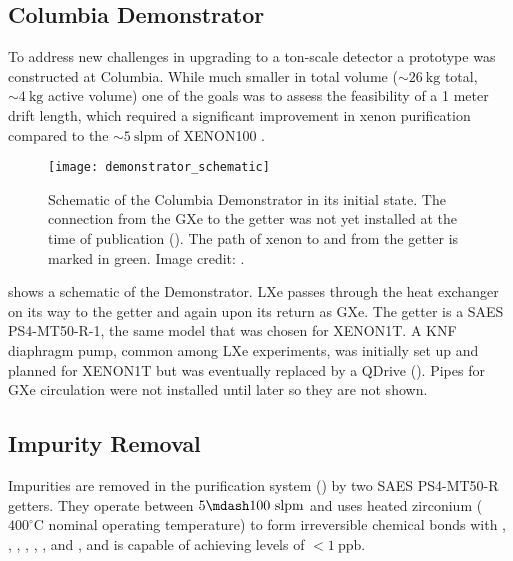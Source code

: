 \subsection{Columbia Demonstrator}
\label{subsec:electron_lifetime_model_demonstrator}
To address new challenges in upgrading to a ton-scale detector a prototype was constructed at Columbia.  While much smaller in total
volume (${\sim}26\ \mathrm{kg}$ total, ${\sim}4\ \mathrm{kg}$ active volume) one of the goals was to assess the feasibility of a 1 meter
drift length, which required a significant improvement in xenon purification compared to the ${\sim}5\ \mathrm{slpm}$ of XENON100
.

\begin{figure}
\centering
\texttt{[image: demonstrator\_schematic]}
\caption{Schematic of the Columbia Demonstrator in its initial state.  The connection from the GXe to the getter was not yet installed
at the time of publication ().  The path of xenon to and from the getter is marked in
green.  Image credit: .}
\label{fig:electron_lifetime_model_demonstrator_schematic}
\end{figure}

 shows a schematic of the Demonstrator.  LXe passes through the heat exchanger
on its way to the getter and again upon its return as GXe.  The getter is a SAES PS4-MT50-R-1, the same model that was chosen for
XENON1T.  A KNF diaphragm pump, common among LXe experiments, was initially set up and planned for XENON1T but was eventually
replaced by a QDrive ().  Pipes for GXe circulation were not installed until later so they are not shown.



\subsection{Impurity Removal}
\label{subsec:electron_lifetime_model_removal}
Impurities are removed in the purification system () by two SAES PS4-MT50-R getters.  They operate between
$5 \mdash 100\ \mathrm{slpm}$ and uses heated zirconium ($400^{\circ}\mathrm{C}$ nominal operating temperature) to form irreversible
chemical bonds with , , , , , , and , and is capable of achieving levels of
$< 1\ \mathrm{ppb}$.

